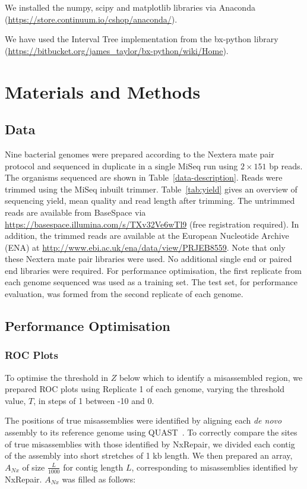 \documentclass[fleqn,10pt]{wlpeerj}
\begin{document}
We installed the numpy, scipy and matplotlib libraries via Anaconda (\url{https://store.continuum.io/cshop/anaconda/}).

We have used the Interval Tree implementation from the bx-python library (\url{https://bitbucket.org/james_taylor/bx-python/wiki/Home}).   

\section*{Materials and Methods}
\subsection*{Data}
Nine bacterial genomes were prepared according to the Nextera mate pair protocol and sequenced in duplicate in a single MiSeq run using $2 \times 151$ bp reads. The organisms sequenced are shown in Table~\ref{data-description}. Reads were trimmed using the MiSeq inbuilt trimmer. Table~\ref{tab:yield} gives an overview of sequencing yield, mean quality and read length after trimming. The untrimmed reads are available from BaseSpace via \url{https://basespace.illumina.com/s/TXv32Ve6wTl9} (free registration required). In addition,
the trimmed reads are available at the European Nucleotide Archive (ENA) at \url{http://www.ebi.ac.uk/ena/data/view/PRJEB8559}. Note that only these Nextera mate pair libraries were used. No additional single end or paired end libraries were required. For performance optimisation, the first replicate from each genome sequenced was used as a training set. The test set, for performance evaluation, was formed from the second replicate of each genome. 

\subsection*{Performance Optimisation}
\subsubsection*{ROC Plots}
To optimise the threshold in $Z$ below which to identify a misassembled region, we prepared ROC plots using Replicate 1 of each genome, varying the threshold value, $T$, in steps of 1 between -10 and 0. 

The positions of true misassemblies were identified by aligning each \textit{de novo} assembly to its reference genome using QUAST~\citep{gurevich2013}. To correctly compare the sites of true misassemblies with those identified by NxRepair, we divided each contig of the assembly into short stretches of 1 kb length. We then prepared an array, $A_{Nx}$ of size $\frac{L}{1000}$ for contig length $L$, corresponding to misassemblies identified by NxRepair. $A_{Nx}$ was filled as follows:
\end{document}

